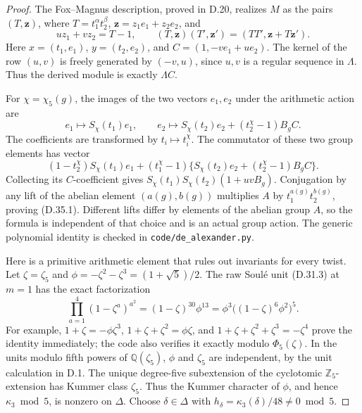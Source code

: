 \begin{proof}
The Fox--Magnus description, proved in D.20,
realizes \(M\) as the pairs
\((T,\mathbf z)\), where
\(T=t_1^\alpha t_2^\beta\),
\(\mathbf z=z_1e_1+z_2e_2\), and
\[
      uz_1+vz_2=T-1,\qquad
 (T,\mathbf z)(T',\mathbf z')
       =(TT',\mathbf z+T\mathbf z').
                                                        \tag{D.35.5}
\]
Here \(x=(t_1,e_1)\), \(y=(t_2,e_2)\),
and \(C=(1,-ve_1+ue_2)\). The kernel of
the row \((u,v)\) is freely generated by
\((-v,u)\), since \(u,v\) is a regular
sequence in \(\Lambda\). Thus the derived
module is exactly \(\Lambda C\).

For \(\chi=\chi_5(g)\), the images of
the two vectors \(e_1,e_2\) under the
arithmetic action are
\[
 e_1\longmapsto S_\chi(t_1)e_1,\qquad
 e_2\longmapsto S_\chi(t_2)e_2
                       +(t_2^\chi-1)B_g C.
                                                        \tag{D.35.6}
\]
The coefficients are transformed by
\(t_i\mapsto t_i^\chi\). The commutator
of these two group elements has vector
\[
 (1-t_2^\chi)S_\chi(t_1)e_1
 +(t_1^\chi-1)
       \{S_\chi(t_2)e_2+(t_2^\chi-1)B_gC\}.
 \]
Collecting its \(C\)-coefficient gives
\(S_\chi(t_1)S_\chi(t_2)(1+uvB_g)\).
Conjugation by any lift of the abelian
element \((a(g),b(g))\) multiplies \(A\)
by \(t_1^{a(g)}t_2^{b(g)}\), proving
(D.35.1). Different lifts differ by
elements of the abelian group \(A\), so
the formula is independent of that
choice and is an actual group action.
The generic polynomial identity is
checked in \texttt{code/de\_alexander.py}.

Here is a primitive arithmetic element that
rules out invariants for every twist.
Let \(\zeta=\zeta_5\) and
\(\phi=-\zeta^2-\zeta^3=(1+\sqrt5)/2\).
The raw Soul\'e unit (D.31.3) at \(m=1\)
has the exact factorization
\[
 \prod_{a=1}^4(1-\zeta^a)^{a^2}
       =(1-\zeta)^{30}\phi^{13}
       =\phi^3\bigl((1-\zeta)^6\phi^2\bigr)^5.
                                                        \tag{D.35.7}
\]
For example,
\(1+\zeta=-\phi\zeta^3\),
\(1+\zeta+\zeta^2=\phi\zeta\), and
\(1+\zeta+\zeta^2+\zeta^3=-\zeta^4\)
prove the identity immediately; the code
also verifies it exactly modulo
\(\Phi_5(\zeta)\). In the units modulo
fifth powers of \(\mathbb Q(\zeta_5)\),
\(\phi\) and \(\zeta_5\) are independent,
by the unit calculation in D.1.
The unique degree-five subextension of
the cyclotomic \(\mathbb Z_5\)-extension
has Kummer class \(\zeta_5\).
Thus the Kummer character of \(\phi\),
and hence \(\kappa_3\bmod5\), is nonzero
on \(\Delta\). Choose
\(\delta\in\Delta\) with
\(h_\delta=\kappa_3(\delta)/48\ne0\bmod5\).


\end{proof}

